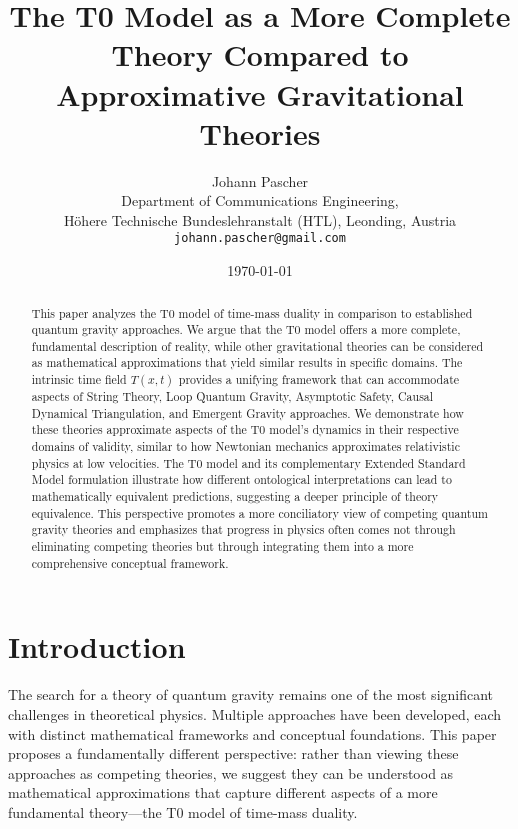 \documentclass[12pt,a4paper]{article}
\newcommand{\Tfieldt}{T(x,t)}
\begin{document}
	
	\title{The T0 Model as a More Complete Theory Compared to Approximative Gravitational Theories}
	\author{Johann Pascher\\
		Department of Communications Engineering, \\Höhere Technische Bundeslehranstalt (HTL), Leonding, Austria\\
		\texttt{johann.pascher@gmail.com}}
	\date{\today}
	
	\maketitle
	
	\begin{abstract}
		This paper analyzes the T0 model of time-mass duality in comparison to established quantum gravity approaches. We argue that the T0 model offers a more complete, fundamental description of reality, while other gravitational theories can be considered as mathematical approximations that yield similar results in specific domains. The intrinsic time field $\Tfieldt$ provides a unifying framework that can accommodate aspects of String Theory, Loop Quantum Gravity, Asymptotic Safety, Causal Dynamical Triangulation, and Emergent Gravity approaches. We demonstrate how these theories approximate aspects of the T0 model's dynamics in their respective domains of validity, similar to how Newtonian mechanics approximates relativistic physics at low velocities. The T0 model and its complementary Extended Standard Model formulation illustrate how different ontological interpretations can lead to mathematically equivalent predictions, suggesting a deeper principle of theory equivalence. This perspective promotes a more conciliatory view of competing quantum gravity theories and emphasizes that progress in physics often comes not through eliminating competing theories but through integrating them into a more comprehensive conceptual framework.
	\end{abstract}
	\newpage
	\tableofcontents
	\newpage
	\section{Introduction}
	\label{sec:introduction}
	
	The search for a theory of quantum gravity remains one of the most significant challenges in theoretical physics. Multiple approaches have been developed, each with distinct mathematical frameworks and conceptual foundations. This paper proposes a fundamentally different perspective: rather than viewing these approaches as competing theories, we suggest they can be understood as mathematical approximations that capture different aspects of a more fundamental theory—the T0 model of time-mass duality.
	
\end{document}
